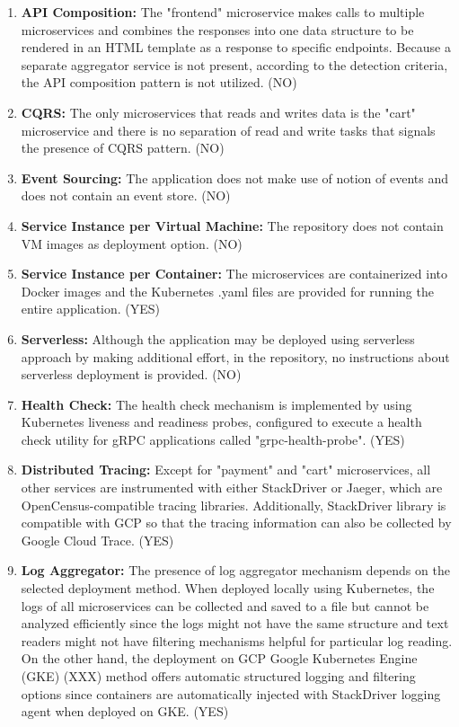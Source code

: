 \documentclass{Configuration_Files/PoliMi3i_thesis}
\begin{document}
\begin{enumerate}
    \item \textbf{API Composition:} The "frontend" microservice makes calls to multiple microservices and combines the responses into one data structure to be rendered in an HTML template as a response to specific endpoints.
    Because a separate aggregator service is not present, according to the detection criteria, the API composition pattern is not utilized. (NO)
    
    \item \textbf{CQRS:} The only microservices that reads and writes data is the "cart" microservice and there is no separation of read and write tasks that signals the presence of CQRS pattern. (NO)
    
    \item \textbf{Event Sourcing:} The application does not make use of notion of events and does not contain an event store. (NO)
    
    \item \textbf{Service Instance per Virtual Machine:} The repository does not contain VM images as deployment option. (NO)
    
    \item \textbf{Service Instance per Container:} The microservices are containerized into Docker images and the Kubernetes .yaml files are provided for running the entire application. (YES)
    
    \item \textbf{Serverless:} Although the application may be deployed using serverless approach by making additional effort, in the repository, no instructions about serverless deployment is provided. (NO)
    
    \item \textbf{Health Check:} The health check mechanism is implemented by using Kubernetes liveness and readiness probes, configured to execute a health check utility for gRPC applications called "grpc-health-probe". (YES)
    
    \item \textbf{Distributed Tracing:} Except for "payment" and "cart" microservices, all other services are instrumented with either StackDriver or Jaeger, which are OpenCensus-compatible tracing libraries.
    Additionally, StackDriver library is compatible with GCP so that the tracing information can also be collected by Google Cloud Trace. (YES)
    
    \item \textbf{Log Aggregator:} The presence of log aggregator mechanism depends on the selected deployment method.
    When deployed locally using Kubernetes, the logs of all microservices can be collected and saved to a file but cannot be analyzed efficiently since the logs might not have the same structure and text readers might not have filtering mechanisms helpful for particular log reading.
    On the other hand, the deployment on GCP Google Kubernetes Engine (GKE) (XXX) method offers automatic structured logging and filtering options since containers are automatically injected with StackDriver logging agent when deployed on GKE. (YES)
    

\end{enumerate}
\end{document}
